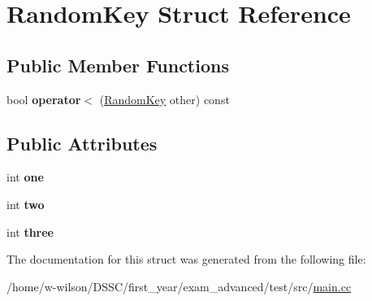 \hypertarget{struct_random_key}{}\section{Random\+Key Struct Reference}
\label{struct_random_key}
\subsection*{Public Member Functions}
\begin{DoxyCompactItemize}
\item 
\mbox{\label{struct_random_key_ac3bee095a4fc60b64bcc1e8ea5c2fd45}} 
bool {\bfseries operator$<$} (\hyperlink{struct_random_key}{Random\+Key} other) const
\end{DoxyCompactItemize}
\subsection*{Public Attributes}
\begin{DoxyCompactItemize}
\item 
\mbox{\label{struct_random_key_a26dbca77342f7c3109d54facfbeb1c2d}} 
int {\bfseries one}
\item 
\mbox{\label{struct_random_key_ad1d15ef83aaf2180176a31222d26f34d}} 
int {\bfseries two}
\item 
\mbox{\label{struct_random_key_a727adb496e623fb7e9d4887f16be933f}} 
int {\bfseries three}
\end{DoxyCompactItemize}


The documentation for this struct was generated from the following file\+:\begin{DoxyCompactItemize}
\item 
/home/w-\/wilson/\+D\+S\+S\+C/first\+\_\+year/exam\+\_\+advanced/test/src/\hyperlink{main_8cc}{main.\+cc}\end{DoxyCompactItemize}
